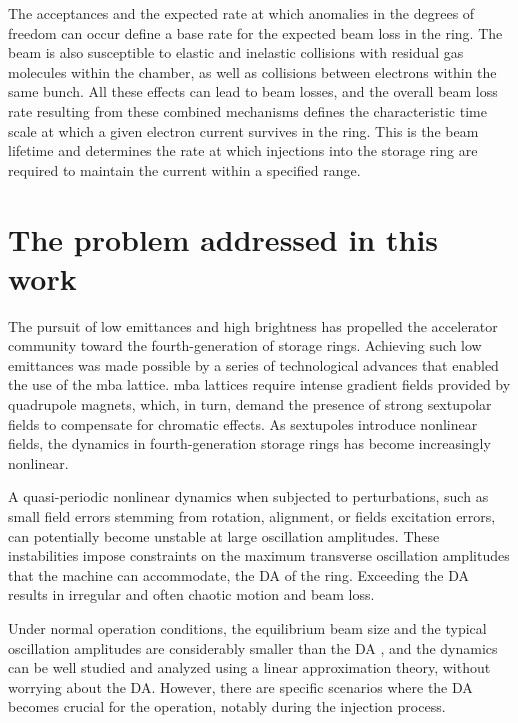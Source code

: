 The acceptances and the expected rate at which anomalies in the degrees of freedom can occur define a base rate for the expected beam loss in the ring. The beam is also susceptible to elastic and inelastic collisions with residual gas molecules within the chamber, as well as collisions between electrons within the same bunch. All these effects can lead to beam losses, and the overall beam loss rate resulting from these combined mechanisms defines the characteristic time scale at which a given electron current survives in the ring. This is the beam lifetime and determines the rate at which injections into the storage ring are required to maintain the current within a specified range.

\section*{The problem addressed in this work}

The pursuit of low emittances and high brightness has propelled the accelerator community toward the fourth-generation of storage rings. Achieving such low emittances was made possible by a series of technological advances that enabled the use of the \gls*{mba} lattice\cite{liu_towards_2017,hettel_challenges_2014}. \gls*{mba} lattices require intense gradient fields provided by quadrupole magnets, which, in turn, demand the presence of strong sextupolar fields to compensate for chromatic effects. As sextupoles introduce nonlinear fields, the dynamics in fourth-generation storage rings has become increasingly nonlinear\cite{liu_towards_2017}.

A quasi-periodic nonlinear dynamics when subjected to perturbations, such as small field errors stemming from rotation, alignment, or fields excitation errors, can potentially become unstable at large oscillation amplitudes. These instabilities impose constraints on the maximum transverse oscillation amplitudes that the machine can accommodate, the \gls*{DA} of the ring. Exceeding the \gls*{DA} results in irregular and often chaotic motion and beam loss.

Under normal operation conditions, the equilibrium beam size and the typical oscillation amplitudes are considerably smaller than the \gls*{DA} , and the dynamics can be well studied and analyzed using a linear approximation theory, without worrying about the \gls*{DA}. However, there are specific scenarios where the \gls*{DA} becomes crucial for the operation, notably during the injection process.


